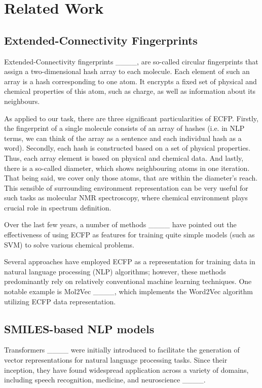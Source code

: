 \section{Related Work}
\subsection{Extended-Connectivity Fingerprints}

Extended-Connectivity fingerprints ____, are so-called circular fingerprints that assign a two-dimensional hash array to each molecule. Each element of such an array is a hash corresponding to one atom. It encrypts a fixed set of physical and chemical properties of this atom, such as charge, as well as information about its neighbours.


As applied to our task, there are three significant particularities of ECFP. Firstly, the fingerprint of a single molecule consists of an array of hashes (i.e. in NLP terms, we can think of the array as a sentence and each individual hash as a word). Secondly, each hash is constructed based on a set of physical properties. Thus, each array element is based on physical and chemical data. And lastly, there is a so-called diameter, which shows neighbouring atoms in one iteration. That being said, we cover only those atoms, that are within the diameter's reach. This sensible of surrounding environment representation can be very useful for such tasks as molecular NMR spectroscopy, where chemical environment plays crucial role in spectrum definition.

Over the last few years, a number of methods ____ have pointed out the effectiveness of using ECFP as features for training quite simple models (such as SVM) to solve various chemical problems. 

Several approaches have employed ECFP as a representation for training data in natural language processing (NLP) algorithms; however, these methods predominantly rely on relatively conventional machine learning techniques. One notable example is Mol2Vec ____, which implements the Word2Vec algorithm utilizing ECFP data representation.

\subsection{SMILES-based NLP models}

Transformers ____ were initially introduced to facilitate the generation of vector representations for natural language processing tasks. Since their inception, they have found widespread application across a variety of domains, including speech recognition, medicine, and neuroscience ____. 

